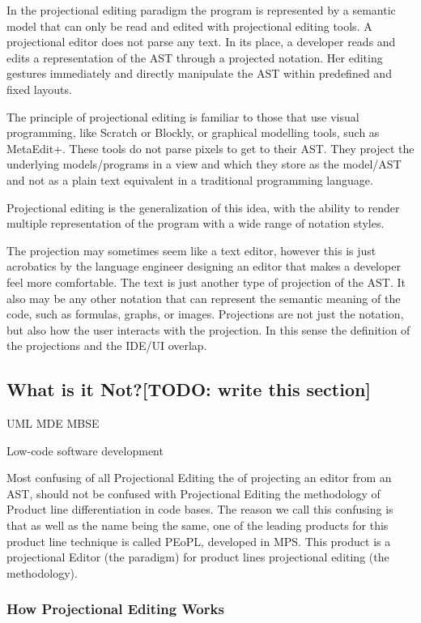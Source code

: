 In the projectional editing paradigm the program is represented by a semantic model that can only be read and edited with projectional editing tools.
A projectional editor does not parse any text.
In its place, a developer reads and edits a representation of the AST through a projected notation.
Her editing gestures immediately and directly manipulate the AST within predefined and fixed layouts.

The principle of projectional editing is familiar to those that use visual programming, like Scratch or Blockly, or graphical modelling tools, such as MetaEdit+.
These tools do not parse pixels to get to their AST.
They project the underlying models/programs in a view and which they store as the model/AST and not as a plain text equivalent in a traditional programming language.

Projectional editing is the generalization of this idea, with the ability to render multiple representation of the program with a wide range of notation styles.

The projection may sometimes seem like a text editor, however this is just acrobatics by the language engineer designing an editor that makes a developer feel more comfortable.
The text is just another type of projection of the AST.
It also may be any other notation that can represent the semantic meaning of the code, such as formulas, graphs, or images.
Projections are not just the notation, but also how the user interacts with the projection.
In this sense the definition of the projections and the IDE/UI overlap.

\subsection{What is it Not?[TODO: write this section]}

UML 
MDE
MBSE

Low-code software development

Most confusing of all Projectional Editing the  of projecting an editor from an AST, should not be confused with Projectional Editing the methodology of Product line differentiation in code bases.
The reason we call this confusing is that as well as the name being the same, one of the leading products for this product line technique is called PEoPL, developed in MPS.
This product is a projectional Editor (the paradigm) for product lines projectional editing (the methodology).

\subsubsection{How Projectional Editing Works}

